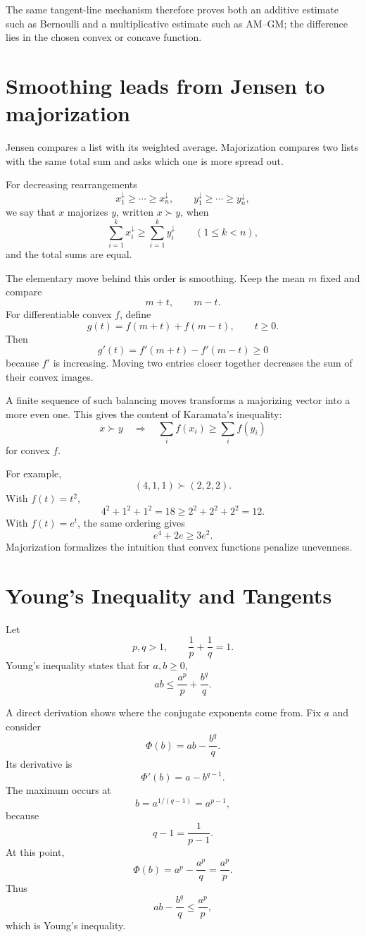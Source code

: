 The same tangent-line mechanism therefore proves both an additive estimate such as Bernoulli and a multiplicative estimate such as AM--GM; the difference lies in the chosen convex or concave function.

\section{Smoothing leads from Jensen to majorization}

Jensen compares a list with its weighted average.  Majorization compares two lists with the same total sum and asks which one is more spread out.

For decreasing rearrangements
\[
  x_1^{\downarrow}\ge\cdots\ge x_n^{\downarrow},
  \qquad
  y_1^{\downarrow}\ge\cdots\ge y_n^{\downarrow},
\]
we say that \(x\) majorizes \(y\), written \(x\succ y\), when
\[
  \sum_{i=1}^k x_i^{\downarrow}
  \ge
  \sum_{i=1}^k y_i^{\downarrow}
  \qquad(1\le k<n),
\]
and the total sums are equal.

The elementary move behind this order is smoothing.  Keep the mean \(m\) fixed and compare
\[
  m+t,
  \qquad
  m-t.
\]
For differentiable convex \(f\), define
\[
  g(t)=f(m+t)+f(m-t),
  \qquad t\ge0.
\]
Then
\[
  g'(t)=f'(m+t)-f'(m-t)\ge0
\]
because \(f'\) is increasing.  Moving two entries closer together decreases the sum of their convex images.

A finite sequence of such balancing moves transforms a majorizing vector into a more even one.  This gives the content of Karamata's inequality:
\[
  x\succ y
  \quad\Longrightarrow\quad
  \sum_i f(x_i)\ge\sum_i f(y_i)
\]
for convex \(f\).

For example,
\[
  (4,1,1)\succ(2,2,2).
\]
With \(f(t)=t^2\),
\[
  4^2+1^2+1^2=18
  \ge
  2^2+2^2+2^2=12.
\]
With \(f(t)=e^t\), the same ordering gives
\[
  e^4+2e\ge3e^2.
\]
Majorization formalizes the intuition that convex functions penalize unevenness.

\section{Young's Inequality and Tangents}

Let
\[
  p,q>1,
  \qquad
  \frac1p+\frac1q=1.
\]
Young's inequality states that for \(a,b\ge0\),
\[
  \boxed{
  ab\le\frac{a^p}{p}+\frac{b^q}{q}.}
\]

A direct derivation shows where the conjugate exponents come from.  Fix \(a\) and consider
\[
  \Phi(b)=ab-\frac{b^q}{q}.
\]
Its derivative is
\[
  \Phi'(b)=a-b^{q-1}.
\]
The maximum occurs at
\[
  b=a^{1/(q-1)}=a^{p-1},
\]
because
\[
  q-1=\frac1{p-1}.
\]
At this point,
\[
  \Phi(b)=a^p-\frac{a^p}{q}=\frac{a^p}{p}.
\]
Thus
\[
  ab-\frac{b^q}{q}\le\frac{a^p}{p},
\]
which is Young's inequality.

